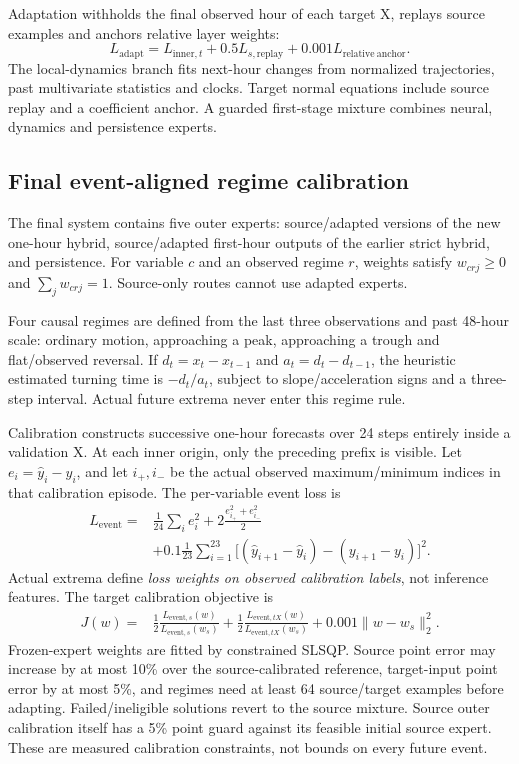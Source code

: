 \documentclass[twoside,english]{article}
\begin{document}
Adaptation withholds the final observed hour of each target X, replays source examples and anchors relative layer weights:
\begin{equation}
L_{\mathrm{adapt}}=L_{\mathrm{inner},t}+0.5L_{s,\mathrm{replay}}+0.001L_{\mathrm{relative\ anchor}}.
\end{equation}
The local-dynamics branch fits next-hour changes from normalized trajectories, past multivariate statistics and clocks. Target normal equations include source replay and a coefficient anchor. A guarded first-stage mixture combines neural, dynamics and persistence experts.

\subsection{Final event-aligned regime calibration}
The final system contains five outer experts: source/adapted versions of the new one-hour hybrid, source/adapted first-hour outputs of the earlier strict hybrid, and persistence. For variable $c$ and an observed regime $r$, weights satisfy $w_{crj}\geq0$ and $\sum_jw_{crj}=1$. Source-only routes cannot use adapted experts.

Four causal regimes are defined from the last three observations and past 48-hour scale: ordinary motion, approaching a peak, approaching a trough and flat/observed reversal. If $d_t=x_t-x_{t-1}$ and $a_t=d_t-d_{t-1}$, the heuristic estimated turning time is $-d_t/a_t$, subject to slope/acceleration signs and a three-step interval. Actual future extrema never enter this regime rule.

Calibration constructs successive one-hour forecasts over 24 steps entirely inside a validation X. At each inner origin, only the preceding prefix is visible. Let $e_i=\widehat y_i-y_i$, and let $i_+,i_-$ be the actual observed maximum/minimum indices in that calibration episode. The per-variable event loss is
\begin{align}
L_{\mathrm{event}}={}&\frac1{24}\sum_i e_i^2+2\frac{e_{i_+}^2+e_{i_-}^2}{2}\nonumber\\
&+0.1\frac1{23}\sum_{i=1}^{23}\big[(\widehat y_{i+1}-\widehat y_i)-(y_{i+1}-y_i)\big]^2.
\end{align}
Actual extrema define \emph{loss weights on observed calibration labels}, not inference features. The target calibration objective is
\begin{align}
J(w)={}&\tfrac12\frac{L_{\mathrm{event},s}(w)}{L_{\mathrm{event},s}(w_s)}+
\tfrac12\frac{L_{\mathrm{event},tX}(w)}{L_{\mathrm{event},tX}(w_s)}+0.001\|w-w_s\|_2^2.
\end{align}
Frozen-expert weights are fitted by constrained SLSQP. Source point error may increase by at most 10\% over the source-calibrated reference, target-input point error by at most 5\%, and regimes need at least 64 source/target examples before adapting. Failed/ineligible solutions revert to the source mixture. Source outer calibration itself has a 5\% point guard against its feasible initial source expert. These are measured calibration constraints, not bounds on every future event.
\end{document}
